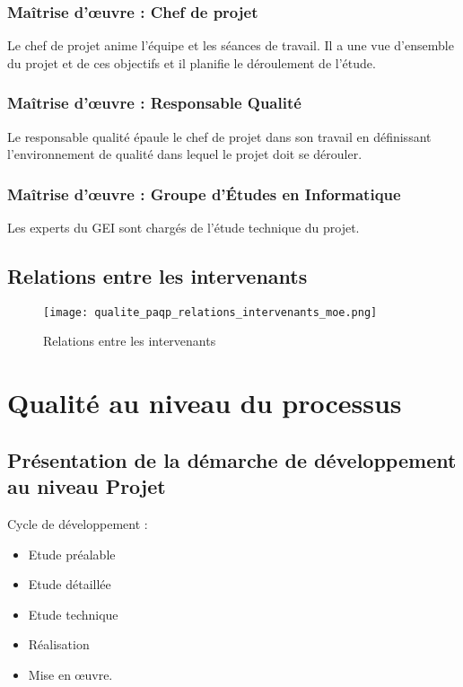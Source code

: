 \subsection{Maîtrise d'\oe uvre : Chef de projet}

Le chef de projet anime l'équipe et les séances de travail. Il a une vue d'ensemble du projet et de ces objectifs et il planifie le déroulement de l'étude.

\subsection{Maîtrise d'\oe uvre : Responsable Qualité}

Le responsable qualité épaule le chef de projet dans son travail en définissant l'environnement de qualité dans lequel le projet doit se dérouler.

\subsection{Maîtrise d'\oe uvre : Groupe d'Études en Informatique}

Les experts du GEI sont chargés de l'étude technique du projet.

\section{Relations entre les intervenants}

\begin{figure}[!htp]
\begin{center}
\texttt{[image: qualite\_paqp\_relations\_intervenants\_moe.png]}
\caption{Relations entre les intervenants}
\label{figure:paqp_relations_intervenants}
\end{center}
\end{figure}

\chapter{Qualité au niveau du processus}

\section{Présentation de la démarche de développement au niveau Projet}

Cycle de développement :
\begin{itemize}
\item Etude préalable
\item Etude détaillée
\item Etude technique
\item Réalisation
\item Mise en \oe uvre.
\end{itemize}

